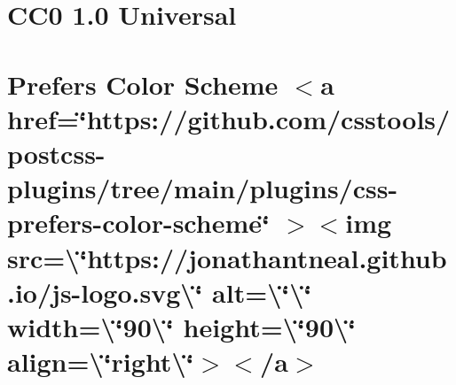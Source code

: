 \documentclass[twoside]{book}
\newcommand{\+}{\discretionary{\mbox{\scriptsize$\hookleftarrow$}}{}{}}
\begin{document}
\chapter{CC0 1.0 Universal}
\label{md__c___users_vaishnavi_jadhav__desktop__developer_code_mean_stack_example_client_node_modules_c4de8054044476e341b94be2729c3bea6}

\chapter{Prefers Color Scheme \texorpdfstring{$<$}{<}a href=\char`\"{}https\+://github.\+com/csstools/postcss-\/plugins/tree/main/plugins/css-\/prefers-\/color-\/scheme\char`\"{} \texorpdfstring{$>$}{>}\texorpdfstring{$<$}{<}img src=\textbackslash{}\char`\"{}https\+://jonathantneal.\+github.\+io/js-\/logo.\+svg\textbackslash{}\char`\"{} alt=\textbackslash{}\char`\"{}\textbackslash{}\char`\"{} width=\textbackslash{}\char`\"{}90\textbackslash{}\char`\"{} height=\textbackslash{}\char`\"{}90\textbackslash{}\char`\"{} align=\textbackslash{}\char`\"{}right\textbackslash{}\char`\"{}\texorpdfstring{$>$}{>}\texorpdfstring{$<$}{<}/a\texorpdfstring{$>$}{>}}
\label{md__c___users_vaishnavi_jadhav__desktop__developer_code_mean_stack_example_client_node_modules_c3ec075c75974546546f2e31d791e1317}

\end{document}
